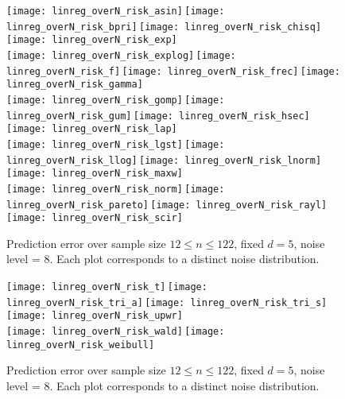 \documentclass[11pt,oneside]{article}
\theoremstyle{definition} \newtheorem{defn}{Definition}       %
\theoremstyle{plain} \newtheorem{prop}[defn]{Proposition}           %
\theoremstyle{plain} \newtheorem{thm}[defn]{Theorem}                %
\theoremstyle{plain} \newtheorem{lem}[defn]{Lemma}                  %
\theoremstyle{plain} \newtheorem{cor}[defn]{Corollary}              %
\theoremstyle{remark} \newtheorem{rmk}[defn]{Remark}                %
\theoremstyle{remark} \newtheorem{ex}[defn]{Example}                %
\begin{document}
\begin{figure}[t]
\centering
\texttt{[image: linreg\_overN\_risk\_asin]}\,\texttt{[image: linreg\_overN\_risk\_bpri]}\,\texttt{[image: linreg\_overN\_risk\_chisq]}\,\texttt{[image: linreg\_overN\_risk\_exp]}\\
\texttt{[image: linreg\_overN\_risk\_explog]}\,\texttt{[image: linreg\_overN\_risk\_f]}\,\texttt{[image: linreg\_overN\_risk\_frec]}\,\texttt{[image: linreg\_overN\_risk\_gamma]}\\
\texttt{[image: linreg\_overN\_risk\_gomp]}\,\texttt{[image: linreg\_overN\_risk\_gum]}\,\texttt{[image: linreg\_overN\_risk\_hsec]}\,\texttt{[image: linreg\_overN\_risk\_lap]}\\
\texttt{[image: linreg\_overN\_risk\_lgst]}\,\texttt{[image: linreg\_overN\_risk\_llog]}\,\texttt{[image: linreg\_overN\_risk\_lnorm]}\,\texttt{[image: linreg\_overN\_risk\_maxw]}\\
\texttt{[image: linreg\_overN\_risk\_norm]}\,\texttt{[image: linreg\_overN\_risk\_pareto]}\,\texttt{[image: linreg\_overN\_risk\_rayl]}\,\texttt{[image: linreg\_overN\_risk\_scir]}
\caption{Prediction error over sample size $12 \leq n \leq 122$, fixed $d=5$, noise level = $8$. Each plot corresponds to a distinct noise distribution.}
\label{fig:overN_all_distros_1}
\end{figure}

\clearpage

\begin{figure}[t]
\centering
\texttt{[image: linreg\_overN\_risk\_t]}\,\texttt{[image: linreg\_overN\_risk\_tri\_a]}\,\texttt{[image: linreg\_overN\_risk\_tri\_s]}\,\texttt{[image: linreg\_overN\_risk\_upwr]}\\
\texttt{[image: linreg\_overN\_risk\_wald]}\,\texttt{[image: linreg\_overN\_risk\_weibull]}
\caption{Prediction error over sample size $12 \leq n \leq 122$, fixed $d=5$, noise level = $8$. Each plot corresponds to a distinct noise distribution.}
\label{fig:overN_all_distros_2}
\end{figure}
\end{document}
